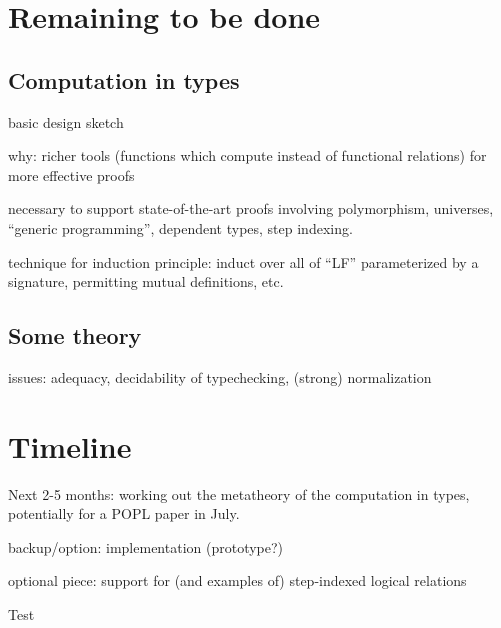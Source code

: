 \documentclass{article}
\begin{document}
\section{Remaining to be done}
\subsection{Computation in types}
basic design sketch

why: richer tools (functions which compute instead of functional
relations) for more effective proofs

necessary to support state-of-the-art proofs involving polymorphism,
universes, ``generic programming'', dependent types, step indexing.

technique for induction principle: induct over all of ``LF''
parameterized by a signature, permitting mutual definitions, etc.
\subsection{Some theory}

issues: adequacy, decidability of typechecking, (strong) normalization
\section{Timeline}
Next 2-5 months: working out the metatheory of the computation in
types, potentially for a POPL paper in July.

backup/option: implementation (prototype?)

optional piece: support for (and examples of) step-indexed logical
relations

\begin{thebibliography}
Test
\end{thebibliography}
\end{document}
